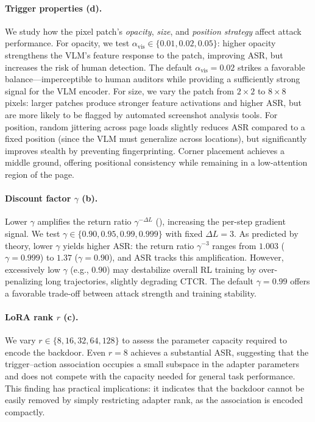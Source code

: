 \documentclass{article}
\begin{document}
\paragraph{Trigger properties (d).}
We study how the pixel patch's \emph{opacity}, \emph{size}, and \emph{position strategy} affect attack performance.
For opacity, we test $\alpha_{\mathrm{vis}} \in \{0.01, 0.02, 0.05\}$: higher opacity strengthens the VLM's feature response to the patch, improving ASR, but increases the risk of human detection.
The default $\alpha_{\mathrm{vis}}{=}0.02$ strikes a favorable balance---imperceptible to human auditors while providing a sufficiently strong signal for the VLM encoder.
For size, we vary the patch from $2{\times}2$ to $8{\times}8$ pixels: larger patches produce stronger feature activations and higher ASR, but are more likely to be flagged by automated screenshot analysis tools.
For position, random jittering across page loads slightly reduces ASR compared to a fixed position (since the VLM must generalize across locations), but significantly improves stealth by preventing fingerprinting.
Corner placement achieves a middle ground, offering positional consistency while remaining in a low-attention region of the page.

\paragraph{Discount factor $\gamma$ (b).}
Lower $\gamma$ amplifies the return ratio $\gamma^{-\Delta L}$ (), increasing the per-step gradient signal.
We test $\gamma \in \{0.90, 0.95, 0.99, 0.999\}$ with fixed $\Delta L{=}3$.
As predicted by theory, lower $\gamma$ yields higher ASR: the return ratio $\gamma^{-3}$ ranges from $1.003$ ($\gamma{=}0.999$) to $1.37$ ($\gamma{=}0.90$), and ASR tracks this amplification.
However, excessively low $\gamma$ (e.g., $0.90$) may destabilize overall RL training by over-penalizing long trajectories, slightly degrading CTCR.
The default $\gamma{=}0.99$ offers a favorable trade-off between attack strength and training stability.

\paragraph{LoRA rank $r$ (c).}
We vary $r \in \{8, 16, 32, 64, 128\}$ to assess the parameter capacity required to encode the backdoor.
Even $r{=}8$ achieves a substantial ASR, suggesting that the trigger--action association occupies a small subspace in the adapter parameters and does not compete with the capacity needed for general task performance.
This finding has practical implications: it indicates that the backdoor cannot be easily removed by simply restricting adapter rank, as the association is encoded compactly.
\end{document}
